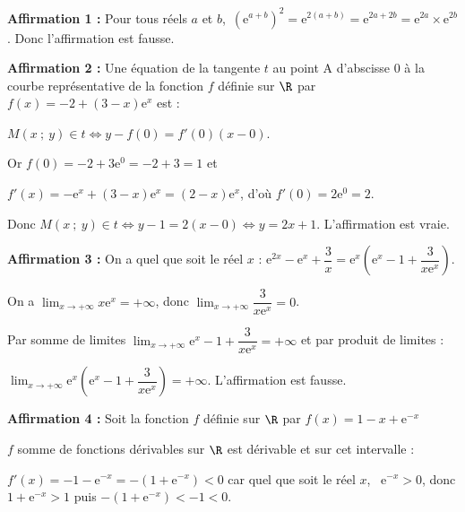 \smallskip













\medskip

\textbf{Affirmation 1 :} Pour tous réels $a$ et $b$,\, $\left(\text{e}^{a+b}\right)^2 =
 \text{e}^{2(a + b)} =  \text{e}^{2a + 2b} = \text{e}^{2a} \times \text{e}^{2b}$. Donc l'affirmation est fausse.

\smallskip
\textbf{Affirmation 2 :}  
Une équation de la tangente $t$ au point A d'abscisse 0 à la courbe représentative de la fonction $f$ définie sur $\R$ par $f(x) = - 2 + (3 - x)\text{e}^x$ est :

$M(x~;~y) \in t \iff y - f(0) = f'(0)(x - 0)$.

Or $f(0) = - 2 + 3\text{e}^0 = - 2 + 3 = 1$ et 

$f'(x) = -\text{e}^x + (3 - x)\text{e}^x = (2 - x)\text{e}^x$, d'où $f'(0) = 2\text{e}^0 = 2$.

Donc $M(x~;~y) \in t \iff y - 1 = 2(x - 0) \iff y = 2x + 1$. L'affirmation est vraie.

\smallskip

\textbf{Affirmation 3 :} 
On a quel que soit le réel $x$ : $\text{e}^{2x} - \text{e}^{x} + \dfrac{3}{x}= \text{e}^{x}\left(\text{e}^{x} - 1 + \dfrac{3}{x\text{e}^{x}}\right)$.

On a $\displaystyle\lim_{x \to + \infty} x\text{e}^{x} = + \infty$, donc $\displaystyle\lim_{x \to + \infty} \dfrac{3}{x\text{e}^{x}} = 0$.

Par somme de limites $\displaystyle\lim_{x \to + \infty}\text{e}^{x} - 1 + \dfrac{3}{x\text{e}^{x}} = + \infty$ et par produit de limites :

$\displaystyle\lim_{x \to + \infty}\text{e}^{x}\left(\text{e}^{x} - 1 + \dfrac{3}{x\text{e}^{x}}\right) = + \infty$. L'affirmation est fausse.

\smallskip

\textbf{Affirmation 4 :} 
Soit la fonction $f$ définie sur $\R$ par $f(x) = 1 - x + \text{e}^{-x}$

$f$ somme de fonctions dérivables sur $\R$ est dérivable et sur cet intervalle :

$f'(x) = - 1 - \text{e}^{-x} = - \left(1 + \text{e}^{-x} \right) < 0$ car quel que soit le réel $x$, \, $\text{e}^{-x}  > 0$, donc $1 + \text{e}^{-x} > 1$ puis $- \left(1 + \text{e}^{-x} \right) < - 1 < 0$.

